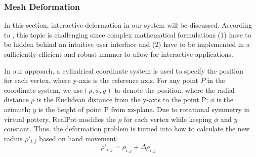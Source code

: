 \documentclass{svjour3}                     %
\begin{document}
\subsubsection{Mesh Deformation}
\label{sec:4.2.3}
In this section, interactive deformation in our system will be discussed. According to \cite{botsch2010polygon}, this topic is challenging since complex mathematical formulations (1) have to be hidden behind an intuitive user interface and (2) have to be implemented in a sufficiently efficient and robust manner to allow for interactive applications.

In our approach, a cylindrical coordinate system is used to specify the position for each vertex, where y-axis is the reference axis. For any point $P$ in the coordinate system, we use$(\rho, \phi, y)$ to denote the position, where the radial distance $\rho$ is the Euclidean distance from the y-axis to the point P; $\phi$ is the azimuth; $y$ is the height of point P from xz-plane.
Due to rotational symmetry in virtual pottery, RealPot modifies the $\rho$ for each vertex while keeping $\phi$ and $y$ constant. Thus, the deformation problem is turned into how to calculate the new radius $\rho'_{i,j}$ based on hand movement:
\begin{equation}
\rho'_{i,j} = \rho_{i,j} + \Delta \rho_{i,j}
\end{equation}
\end{document}
